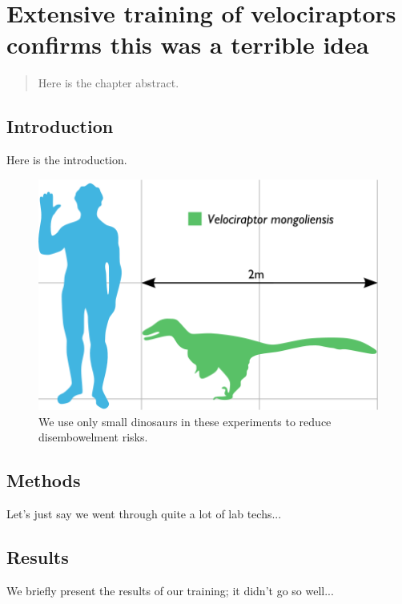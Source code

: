 \chapter[Training velociraptors to hoverboard]{Extensive training of velociraptors confirms this was a terrible idea}
\label{chap:velociraptor}

\begin{abstract}
  Here is the chapter abstract.
\end{abstract}

\section{Introduction}

Here is the introduction.

\begin{figure}
  \centering
  \includegraphics[width=.95\textwidth]{ch3-velociraptor/Velociraptor.png}%
  \caption[Velociraptors to scale]{We use only small dinosaurs in these experiments to reduce disembowelment risks.}
  \label{fig:velociraptor}
\end{figure}

\section{Methods}

Let's just say we went through quite a lot of lab techs...

\section{Results}
We briefly present the results of our training; it didn't go so well...

